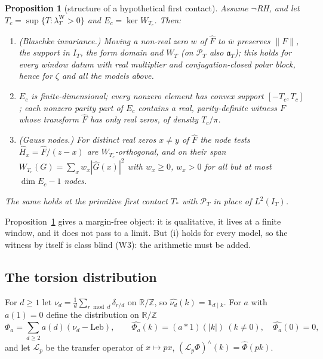 \documentclass[11pt]{amsart}
\newtheorem{proposition}[theorem]{Proposition}
\theoremstyle{definition}
\theoremstyle{remark}
\newcommand{\R}{\mathbb R}
\newcommand{\Z}{\mathbb Z}
\newcommand{\PT}{\mathcal P_T}
\newcommand{\IT}{I_T}
\newcommand{\lamW}{\lambda^{\mathrm W}_T}
\newcommand{\Fh}{\widehat F}
\newcommand{\Leb}{\mathrm{Leb}}
\newcommand{\cL}{\mathscr L}
\begin{document}
\begin{proposition}[structure of a hypothetical first contact]\label{prop:witness}
Assume $\neg$RH, and let $T_c=\sup\{T:\lamW>0\}$ and $E_c=\ker W_{T_c}$. Then:
\begin{enumerate}
\item[(i)] \emph{(Blaschke invariance.)} Moving a non-real zero $w$ of $\Fh$ to $\bar w$ preserves $\|F\|$,
 the support in $I_T$, the form domain and $W_T$ (on $\PT$ also $\mathfrak a_T$); this holds for every window
 datum with real multiplier and conjugation-closed polar block, hence for $\zeta$ and all the models above.
\item[(ii)] $E_c$ is finite-dimensional; every nonzero element has convex support $[-T_c,T_c]$; each nonzero
 parity part of $E_c$ contains a real, parity-definite \emph{witness} $F$ whose transform $\Fh$ has only real
 zeros, of density $T_c/\pi$.
\item[(iii)] \emph{(Gauss nodes.)} For distinct real zeros $x\ne y$ of $\Fh$ the node tests
 $\widehat H_x=\Fh/(z-x)$ are $W_{T_c}$-orthogonal, and on their span
 $W_{T_c}(G)=\sum_xw_x|\widehat G(x)|^2$ with $w_x\ge0$, $w_x>0$ for all but at most $\dim E_c-1$ nodes.
\end{enumerate}
The same holds at the primitive first contact $T_*$ with $\PT$ in place of $L^2(\IT)$.
\end{proposition}

Proposition~\ref{prop:witness} gives a margin-free object: it is qualitative, it lives at a finite
window, and it does not pass to a limit. But (i) holds for every model, so the witness by itself is class
blind (W3): the arithmetic must be added.

\subsection{The torsion distribution}
For $d\ge1$ let $\nu_d=\frac1d\sum_{r\bmod d}\delta_{r/d}$ on $\R/\Z$, so $\widehat{\nu_d}(k)=\mathbf1_{d\mid k}$.
For $a$ with $a(1)=0$ define the distribution on $\R/\Z$
\begin{equation}\label{eq:Phi}
\Phi_a=\sum_{d\ge2}a(d)(\nu_d-\Leb),\qquad \widehat{\Phi_a}(k)=(a*1)(|k|)\ (k\ne0),\quad\widehat{\Phi_a}(0)=0,
\end{equation}
and let $\cL_p$ be the transfer operator of $x\mapsto px$, $(\cL_p\Phi)^\wedge(k)=\widehat\Phi(pk)$.
\end{document}
